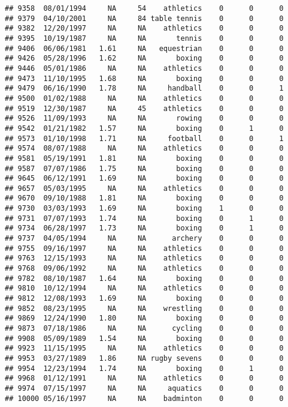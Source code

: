 \documentclass[]{article}
\begin{document}
\begin{verbatim}
## 9358  08/01/1994     NA     54    athletics    0      0      0
## 9379  04/10/2001     NA     84 table tennis    0      0      0
## 9382  12/20/1997     NA     NA    athletics    0      0      0
## 9395  10/19/1987     NA     NA       tennis    0      0      0
## 9406  06/06/1981   1.61     NA   equestrian    0      0      0
## 9426  05/28/1996   1.62     NA       boxing    0      0      0
## 9446  05/01/1986     NA     NA    athletics    0      0      0
## 9473  11/10/1995   1.68     NA       boxing    0      0      0
## 9479  06/16/1990   1.78     NA     handball    0      0      1
## 9500  01/02/1988     NA     NA    athletics    0      0      0
## 9519  12/30/1987     NA     45    athletics    0      0      0
## 9526  11/09/1993     NA     NA       rowing    0      0      0
## 9542  01/21/1982   1.57     NA       boxing    0      1      0
## 9573  01/10/1998   1.71     NA     football    0      0      1
## 9574  08/07/1988     NA     NA    athletics    0      0      0
## 9581  05/19/1991   1.81     NA       boxing    0      0      0
## 9587  07/07/1986   1.75     NA       boxing    0      0      0
## 9645  06/12/1991   1.69     NA       boxing    0      0      0
## 9657  05/03/1995     NA     NA    athletics    0      0      0
## 9670  09/10/1988   1.81     NA       boxing    0      0      0
## 9730  03/03/1993   1.69     NA       boxing    1      0      0
## 9731  07/07/1993   1.74     NA       boxing    0      1      0
## 9734  06/28/1997   1.73     NA       boxing    0      1      0
## 9737  04/05/1994     NA     NA      archery    0      0      0
## 9755  09/16/1997     NA     NA    athletics    0      0      0
## 9763  12/15/1993     NA     NA    athletics    0      0      0
## 9768  09/06/1992     NA     NA    athletics    0      0      0
## 9782  08/10/1987   1.64     NA       boxing    0      0      0
## 9810  10/12/1994     NA     NA    athletics    0      0      0
## 9812  12/08/1993   1.69     NA       boxing    0      0      0
## 9852  08/23/1995     NA     NA    wrestling    0      0      0
## 9869  12/24/1990   1.80     NA       boxing    0      0      0
## 9873  07/18/1986     NA     NA      cycling    0      0      0
## 9908  05/09/1989   1.54     NA       boxing    0      0      0
## 9923  11/15/1995     NA     NA    athletics    0      0      0
## 9953  03/27/1989   1.86     NA rugby sevens    0      0      0
## 9954  12/23/1994   1.74     NA       boxing    0      1      0
## 9968  01/12/1991     NA     NA    athletics    0      0      0
## 9974  07/15/1997     NA     NA     aquatics    0      0      0
## 10000 05/16/1997     NA     NA    badminton    0      0      0

\end{verbatim}
\end{document}
